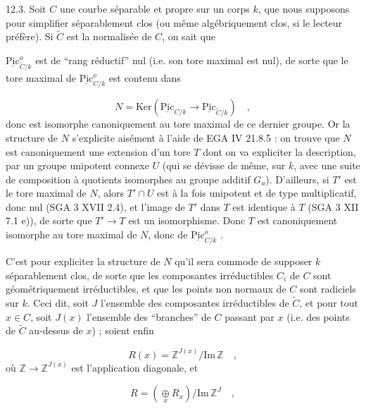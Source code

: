 12.3. Soit $C$ une courbe séparable et propre sur un corps $k$, que nous supposons pour simplifier séparablement clos (ou même algébriquement clos, si le lecteur préfère). Si $\widetilde{C}$ est la normalisée de $C$, on sait que



$\underline{\mathrm{Pic}}^o_{\widetilde{C}/k}$ est de ``rang réductif'' nul (i.e. son tore maximal est nul), de sorte que le tore maximal de $\underline{\mathrm{Pic}}^o_{C/k}$ est contenu dans

\begin{equation*}
N = \mathrm{Ker}(\underline{\mathrm{Pic}}_{C/k} \longrightarrow \underline{\mathrm{Pic}}_{\widetilde{C}/k}) \quad ,
\end{equation*}
donc est isomorphe canoniquement au tore maximal de ce dernier groupe. Or la structure de $N$ s'explicite aisément à l'aide de EGA IV 21.8.5 : on trouve que $N$ est canoniquement une extension d'un tore $T$ dont on va expliciter la description, par un groupe unipotent connexe $U$ (qui se dévisse de même, sur $k$, avec une suite de composition à quotients isomorphes au groupe additif $G_a$). D'ailleurs, si $T'$ est le tore maximal de $N$, alors $T' \cap U$ est à la fois unipotent et de type multiplicatif, donc nul (SGA 3 XVII 2.4), et l'image de $T'$ dans $T$ est identique à $T$ (SGA 3 XII 7.1 e)), de sorte que $T' \longrightarrow T$ est un isomorphisme. Donc $T$ est canoniquement isomorphe au tore maximal de $N$, donc de $\underline{\mathrm{Pic}}^o_{C/k}$ .

C'est pour expliciter la structure de $N$ qu'il sera commode de supposer $k$ séparablement clos, de sorte que les composantes irréductibles $C_i$ de $C$ sont géométriquement irréductibles, et que les points non normaux de $C$ sont radiciels sur $k$. Ceci dit, soit $J$ l'ensemble des composantes irréductibles de $\widetilde{C}$, et pour tout $x \in C$, soit $J(x)$ l'ensemble des ``branches'' de $C$ passant par $x$ (i.e. des points de $\widetilde{C}$ au-dessus de $x$) ; soient enfin

\begin{equation}\tag{12.3.1}
R(x) = \mathbb{Z}^{J(x)}/\mathrm{Im}\,\mathbb{Z} \quad ,
\end{equation}
où $\mathbb{Z} \longrightarrow \mathbb{Z}^{J(x)}$ est l'application diagonale, et

\begin{equation}\tag{12.3.2}
R = (\mathop{\oplus}\limits_{x} R_x)/\mathrm{Im}\,\mathbb{Z}^J \quad ,
\end{equation}


